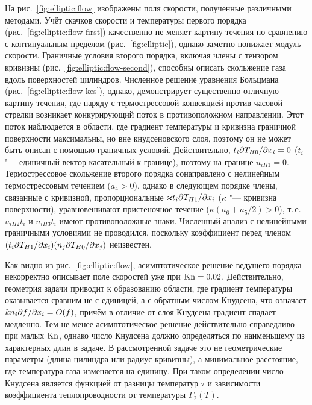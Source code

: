 На рис.~\ref{fig:elliptic:flow} изображены поля скорости, полученные различными методами.
Учёт скачков скорости и температуры первого порядка (рис.~\ref{fig:elliptic:flow-first})
качественно не меняет картину течения по сравнению с континуальным пределом (рис.~\ref{fig:elliptic}),
однако заметно понижает модуль скорости.
Граничные условия второго порядка, включая члены с тензором кривизны (рис.~\ref{fig:elliptic:flow-second}),
способны описать скольжение газа вдоль поверхностей цилиндров.
Численное решение уравнения Больцмана (рис.~\ref{fig:elliptic:flow-kes}),
однако, демонстрирует существенно отличную картину течения,
где наряду с термострессовой конвекцией против часовой стрелки возникает конкурирующий поток
в противоположном направлении. Этот поток наблюдается в области,
где градиент температуры и кривизна граничной поверхности максимальны, но вне кнудсеновского слоя,
поэтому он не может быть описан с помощью граничных условий.
Действительно, \(t_i\Pder[T_{H0}]{x_i}=0\) (\(t_i\) "--- единичный вектор касательный к границе),
поэтому на границе \(u_{iH1}=0\).
Термострессовое скольжение второго порядка сонаправлено с нелинейным термострессовым течением (\(a_4>0\)),
однако в следующем порядке члены, связанные с кривизной, пропорциональные \(\kappa t_i\Pder[T_{H1}]{x_i}\)
(\(\kappa\) "--- кривизна поверхности), уравновешивают пристеночное течение (\(\kappa(a_6+a_5/2)>0\)),
т.\,е. \(u_{iH2}t_i\) и \(u_{iH3}t_i\) имеют противоположные знаки.
Численный анализ с нелинейными граничными условиями не проводился,
поскольку коэффициент перед членом \((t_i\Pder[T_{H1}]{x_i})(n_j\Pder[T_{H0}]{x_j})\) неизвестен.

Как видно из рис.~\ref{fig:elliptic:flow}, асимптотическое решение ведущего порядка некорректно описывает
поле скоростей уже при \(\Kn=0.02\). Действительно, геометрия задачи приводит к образованию области,
где градиент температуры оказывается сравним не с единицей, а с обратным числом Кнудсена,
что означает \(kn_i\Pder[f]{x_i} = \OO{f}\), причём в отличие от слоя Кнудсена градиент спадает медленно.
Тем не менее асимптотическое решение действительно справедливо при малых \(\Kn\),
однако число Кнудсена должно определяться по наименьшему из характерных длин в задаче.
В рассмотренной задаче это не геометрические параметры (длина цилиндра или радиус кривизны),
а минимальное расстояние, где температура газа изменяется на единицу.
При таком определении число Кнудсена является функцией от разницы температур \(\tau\)
и зависимости коэффициента теплопроводности от температуры \(\Gamma_2(T)\).

